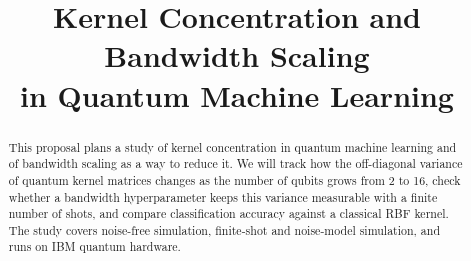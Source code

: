 \documentclass[conference]{IEEEtran}
\begin{document}
\title{Kernel Concentration and Bandwidth Scaling\\in Quantum Machine Learning}

\author{
}

\maketitle

\begin{abstract}
This proposal plans a study of kernel concentration in quantum machine learning and of bandwidth scaling as a way to reduce it. We will track how the off-diagonal variance of quantum kernel matrices changes as the number of qubits grows from 2 to 16, check whether a bandwidth hyperparameter keeps this variance measurable with a finite number of shots, and compare classification accuracy against a classical RBF kernel. The study covers noise-free simulation, finite-shot and noise-model simulation, and runs on IBM quantum hardware.
\end{abstract}
\end{document}
